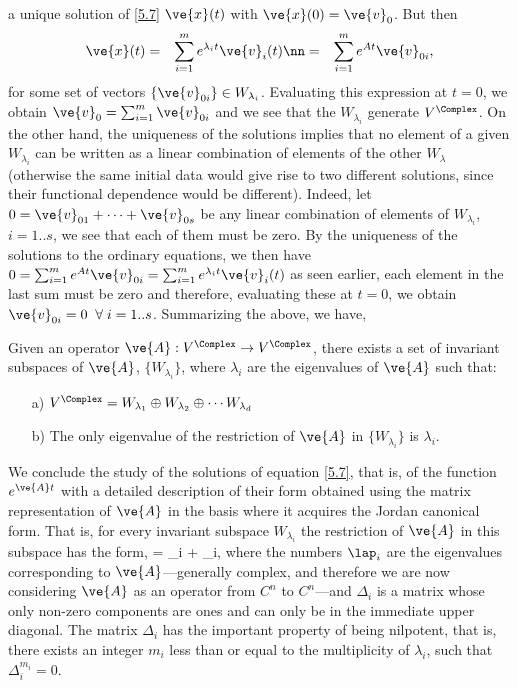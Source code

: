 a unique solution of \ref{5.7} $\ve{x}(t)$ with $\ve{x}(0) = \ve{v}_0$.
But then 
\begin{eqnarray}
  \ve{x}(t) &=& \sum_{i=1}^{m} e^{\lambda_i t} \ve{v}_i(t) \nn
            &=& \sum_{i=1}^{m} e^{A t} \ve{v}_{0i}, 
\end{eqnarray}
for some set of vectors $\{\ve{v}_{0i}\} \in W_{\lambda_i}$.
Evaluating this expression at $t=0$, we obtain
$\ve{v}_0 = \sum_{i=1}^{m} \ve{v}_{0i}$ and we see that the $W_{\lambda_i}$
generate $V^{\Complex}$.
On the other hand, the uniqueness of the solutions implies that no 
element of a given $W_{\lambda_i}$ can be written as
a linear combination of elements of the other $W_{\lambda}$
(otherwise the same initial data would give rise to two
different solutions, since their functional dependence would be
different). Indeed, let $0 = \ve{v}_{01}+ \dots + \ve{v}_{0s}$
be any linear combination of elements of $W_{\lambda_i}$, $i=1..s$,
we see that each of them must be zero. By the uniqueness of the solutions
to the ordinary equations, we then have 
$0 = \sum_{i=1}^{m} e^{A t} \ve{v}_{0i} =  \sum_{i=1}^{m} e^{\lambda_i t} \ve{v}_i(t)$
as seen earlier, each element in the last sum must be zero
and therefore, evaluating these at $t=0$, we obtain $\ve{v}_{0i}=0\;\; \forall \; i=1..s$.
Summarizing the above, we have,

\bteo
\label{5_teo_2}
Given an operator $\ve{A}:V^{\Complex} \to V^{\Complex}$, there exists
a set of invariant subspaces of $\ve{A}$, $\{W_{\lambda_i}\}$,
where $ \lambda_i$ are the eigenvalues of $\ve{A}$ such that:
\begin{itemize}
\item[a)] 
$V^{\Complex} = W_{\lambda_1} \oplus W_{\lambda_2}\oplus \cdots W_{\lambda_d}$

\item[b)] 
The only eigenvalue of the restriction of $\ve{A}$ in $\{W_{\lambda_i}\}$
is $ \lambda_i$.
\end{itemize}
\eteo






We conclude the study of the solutions of equation \ref{5.7},
that is, of the function $e^{\ve{A}t}$ with a detailed description
of their form obtained using the matrix representation 
of $\ve{A}$ in the basis
where it acquires the Jordan canonical form.
That is, for every invariant subspace $W_{\lambda_i}$ 
the restriction 
of $\ve{A}$ in this subspace has the form,
\beq
{}= \lap_i + \Delta_i,
\eeq
\noi where the numbers $\lap_i$ are the eigenvalues
corresponding to $\ve{A}$---generally complex, and therefore we are
now considering $\ve{A}$ as an operator from $C^n$ to $C^n$---and
$\Delta_i$ is a matrix whose only non-zero components are ones and
can only be in the immediate upper diagonal. The
matrix $\Delta_i$ has the important property of being nilpotent, that is,
there exists an integer $m_i$ less than or equal to the multiplicity of $\lambda_i$, 
such that $\Delta_i^{m_{i}}=0$.

